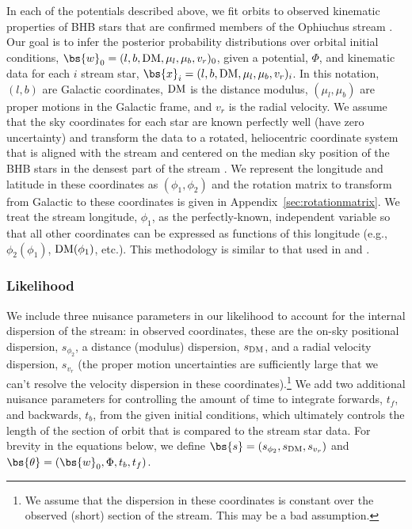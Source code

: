 \documentclass[letterpaper,12pt,preprint]{aastex}
\newcommand{\DM}{{\rm DM}}
\begin{document}
In each of the potentials described above, we fit orbits to observed kinematic properties of BHB stars that are confirmed members of the Ophiuchus stream \citep{sesar15a, sesar15b}. Our goal is to infer the posterior probability distributions over orbital initial conditions, $\bs{w}_0=(l, b, \DM, \mu_l, \mu_b, v_r)_0$, given a potential, $\Phi$, and kinematic data for each $i$ stream star, $\bs{x}_i=(l, b, \DM, \mu_l, \mu_b, v_r)_i$. In this notation, $(l, b)$ are Galactic coordinates, $\DM$ is the distance modulus, $(\mu_l, \mu_b)$ are proper motions in the Galactic frame, and $v_r$ is the radial velocity. We assume that the sky coordinates for each star are known perfectly well (have zero uncertainty) and transform the data to a rotated, heliocentric coordinate system that is aligned with the stream and centered on the median sky position of the BHB stars in the densest part of the stream \cite[all BHB stars except the `fanned' stars: cand15, cand26, cand49, cand54 from][]{sesar15b}. We represent the longitude and latitude in these coordinates as $(\phi_1, \phi_2)$ and the rotation matrix to transform from Galactic to these coordinates is given in Appendix~\ref{sec:rotationmatrix}. We treat the stream longitude, $\phi_1$, as the perfectly-known, independent variable so that all other coordinates can be expressed as functions of this longitude (e.g., $\phi_2(\phi_1)$, ${\rm DM}(\phi_1)$, etc.). This methodology is similar to that used in \cite{koposov10} and \cite{sesar15a}.

\subsubsection{Likelihood}

We include three nuisance parameters in our likelihood to account for the internal dispersion of the stream: in observed coordinates, these are the on-sky positional dispersion, $s_{\phi_2}$, a distance (modulus) dispersion, $s_{\DM}$, and a radial velocity dispersion, $s_{v_r}$ (the proper motion uncertainties are sufficiently large that we can't resolve the velocity dispersion in these coordinates).\footnote{We assume that the dispersion in these coordinates is constant over the observed (short) section of the stream. This may be a bad assumption.} We add two additional nuisance parameters for controlling the amount of time to integrate forwards, $t_f$, and backwards, $t_b$, from the given initial conditions, which ultimately controls the length of the section of orbit that is compared to the stream star data. For brevity in the equations below, we define $\bs{s} = (s_{\phi_2}, s_{\DM}, s_{v_r})$ and $\bs{\theta} = (\bs{w}_0, \Phi, t_b, t_f)$.
\end{document}
